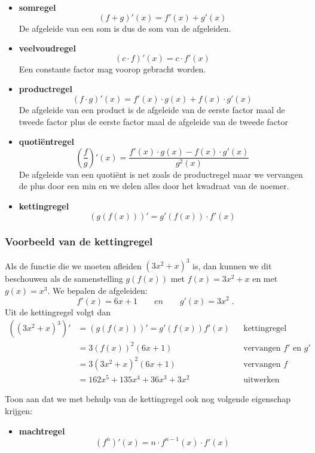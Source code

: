 \documentclass[a4paper,12pt,twoside]{article}
\newenvironment{kader}{
  \begin{mdframed}[nobreak=true]
  }{%
  \end{mdframed}
}
\begin{document}
\begin{kader}
  \begin{itemize}
  \item {\bf somregel}
    $$(f+g)'(x)=f'(x)+g'(x)$$
    De afgeleide van een som is dus de som van de afgeleiden.
  \item {\bf veelvoudregel}
    $$(c\cdot f)'(x) = c\cdot f'(x)$$
    Een constante factor mag voorop gebracht worden.
  \item {\bf productregel}
    $$(f\cdot g)'(x)=f'(x)\cdot g(x) + f(x)\cdot g'(x)$$
    De afgeleide van een product is de afgeleide van de eerste factor maal de tweede factor plus de eerste factor maal de afgeleide van de tweede factor
  \item {\bf quotiëntregel}
    $$\left(\dfrac{f}{g}\right)'(x)=\dfrac{f'(x)\cdot g(x)-f(x)\cdot g'(x)}{g^2(x)}$$
    De afgeleide van een quotiënt is net zoals de productregel maar we vervangen de plus door een min en we delen alles door het kwadraat van de noemer.
  \item {\bf kettingregel}
    $$\left(g\left(f\left(x\right)\right)\right)'=g'(f(x))\cdot f'(x)$$
  \end{itemize}
\end{kader}

\subsubsection*{Voorbeeld van de kettingregel}

Als de functie die we moeten afleiden $(3x^2+x)^3$ is, dan kunnen we dit beschouwen als de samenstelling $g(f(x))$ met $f(x)=3x^2+x$ en met $g(x)=x^3$. We bepalen de afgeleiden:
$$f'(x)=6x+1 \qquad en \qquad g'(x)=3x^2\;.$$
Uit de kettingregel volgt dan
\begin{align*}
  \left((3x^2+x)^3\right)' & =\left(g\left(f\left(x\right)\right)\right)' =g'(f(x)) f'(x) &&\mbox{kettingregel}\\
                           & =3(f(x))^2 (6x+1) &&\mbox{vervangen $f'$ en $g'$}\\
                           & = 3(3x^2+x)^2(6x+1) &&\mbox{vervangen $f$}\\
                           & = 162x^5 + 135x^4 + 36x^3 + 3x^2 &&\mbox{uitwerken}
\end{align*}

\begin{oefening}
  Toon aan dat we met behulp van de kettingregel ook nog volgende eigenschap krijgen:
  \begin{mdframed}
    \begin{itemize}
    \item {\bf machtregel}
      $$(f^n)'(x)=n\cdot f^{n-1}(x) \cdot f'(x)$$
    \end{itemize}
  \end{mdframed}
\end{oefening}
\end{document}
